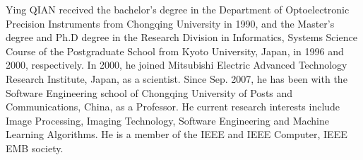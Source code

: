 \documentclass[10pt,journal,compsoc]{IEEEtran}
\begin{document}
\begin{IEEEbiography}{Ying QIAN}
	received the bachelor’s degree in the Department of Optoelectronic Precision Instruments from Chongqing University in 1990, and the Master’s degree and Ph.D degree in the Research Division in Informatics, Systems Science Course of the Postgraduate School from Kyoto University, Japan, in 1996 and 2000, respectively. In 2000, he joined Mitsubishi Electric Advanced Technology Research Institute, Japan, as a scientist. Since Sep. 2007, he has been with the Software Engineering school of Chongqing University of Posts and Communications, China, as a Professor. He current research interests include Image Processing, Imaging Technology, Software Engineering and Machine Learning Algorithms. He is a member of the IEEE and IEEE Computer, IEEE EMB society.
\end{IEEEbiography}
\end{document}
